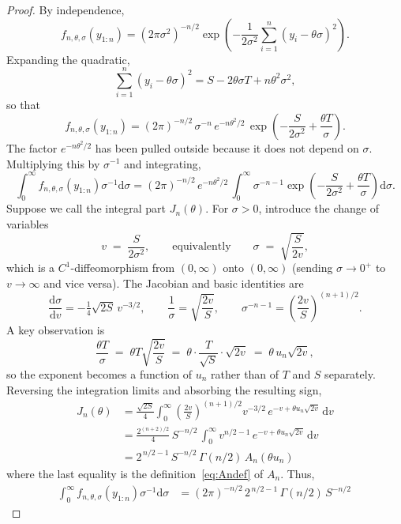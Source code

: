 \documentclass[numsec,webpdf,modern,medium,namedate]{oup-authoring-template}
\theoremstyle{thmstyleone}%
\theoremstyle{thmstyletwo}%
\theoremstyle{thmstylethree}%
\newcommand{\diff}{\mathrm{d}}
\newcommand{\1}{\mathbf{1}}
\begin{document}
\begin{appendices}
\begin{proof}
By independence,
\[
f_{n,\theta,\sigma}(y_{1:n})
= (2\pi\sigma^{2})^{-n/2}\exp\!\left(
   -\frac{1}{2\sigma^{2}}\sum_{i=1}^{n}(y_i-\theta\sigma)^{2}\right).
\]
Expanding the quadratic,
\[
\sum_{i=1}^{n}(y_i-\theta\sigma)^{2}
= S - 2\theta\sigma T + n\theta^{2}\sigma^{2},
\]
so that
\[
f_{n,\theta,\sigma}(y_{1:n})
= (2\pi)^{-n/2}\,\sigma^{-n}\,
  e^{-n\theta^{2}/2}\,
  \exp\!\left(-\frac{S}{2\sigma^{2}} + \frac{\theta T}{\sigma}\right).
\]
The factor $e^{-n\theta^{2}/2}$ has been pulled outside because it does not depend on $\sigma$. Multiplying this by $\sigma^{-1}$ and integrating,
\begin{equation}
\label{eq:Ipre}
\int_{0}^{\infty}\! f_{n,\theta,\sigma}(y_{1:n})\sigma^{-1}\diff\sigma
= (2\pi)^{-n/2}\,e^{-n\theta^{2}/2}\,
\int_{0}^{\infty}\!\sigma^{-n-1}
   \exp\!\left(-\frac{S}{2\sigma^{2}}+\frac{\theta T}{\sigma}\right)\diff\sigma.
\end{equation}
Suppose we call the integral part $J_n(\theta)$. For $\sigma>0$, introduce the change of variables
\[
v \;=\; \frac{S}{2\sigma^{2}},
\qquad\text{equivalently}\qquad
\sigma \;=\; \sqrt{\frac{S}{2v}},
\]
which is a $C^{1}$-diffeomorphism from $(0,\infty)$ onto $(0,\infty)$ (sending
$\sigma\to 0^{+}$ to $v\to\infty$ and vice versa). The Jacobian and basic
identities are
\[
\frac{\diff\sigma}{\diff v}
= -\tfrac{1}{4}\sqrt{2S}\,v^{-3/2},
\qquad
\frac{1}{\sigma}=\sqrt{\frac{2v}{S}},
\qquad
\sigma^{-n-1}=\left(\frac{2v}{S}\right)^{(n+1)/2}.
\]
A key observation is
\[
\frac{\theta T}{\sigma}
\;=\;\theta T\sqrt{\frac{2v}{S}}
\;=\;\theta \cdot \frac{T}{\sqrt{S}}\cdot \sqrt{2v}
\;=\;\theta\, u_n \sqrt{2v},
\]
so the exponent becomes a function of $u_n$ rather than of $T$ and $S$
separately. Reversing the integration limits and absorbing the resulting
sign,
\allowdisplaybreaks
\begin{align*}
J_n(\theta)
& = \frac{\sqrt{2S}}{4}
\int_{0}^{\infty}\!\left(\frac{2v}{S}\right)^{\!(n+1)/2}\! v^{-3/2}\,
e^{-v + \theta u_n\sqrt{2v}}\,\diff v\\
& = \frac{2^{(n+2)/2}}{4}\, S^{-n/2}\,
   \int_{0}^{\infty}\! v^{n/2-1}\,
   e^{-v + \theta u_n\sqrt{2v}}\,\diff v\\
& = 2^{\,n/2-1}\, S^{-n/2}\, \Gamma(n/2)\, A_n(\theta u_n)
\end{align*}
where the last equality is the definition~\eqref{eq:Andef} of $A_n$. Thus,
\begin{align*}
\int_{0}^{\infty} f_{n,\theta,\sigma}(y_{1:n})\sigma^{-1}\diff\sigma
&= (2\pi)^{-n/2}\,2^{\,n/2-1}\,\Gamma(n/2)\,S^{-n/2}\,

\end{align*}
\end{proof}
\end{appendices}
\end{document}
